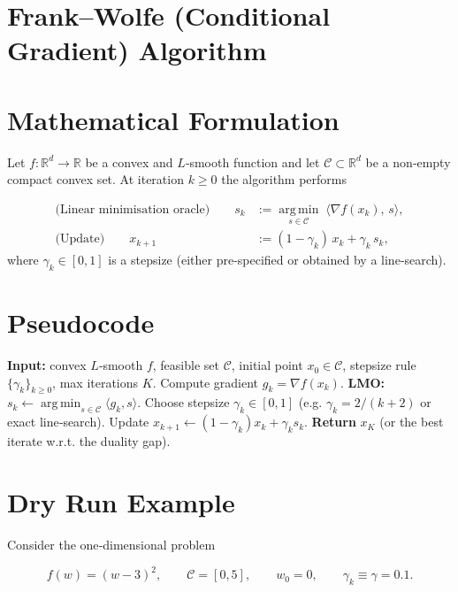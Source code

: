 \documentclass{article}
\newcommand{\argmin}{\operatorname*{arg\,min}}
\begin{document}
\section*{Frank–Wolfe (Conditional Gradient) Algorithm}

\section*{Mathematical Formulation}
Let $f:\mathbb{R}^d\rightarrow\mathbb{R}$ be a convex and $L$‑smooth function and let $\mathcal{C}\subset\mathbb{R}^d$ be a non‑empty compact convex set.  
At iteration $k\ge 0$ the algorithm performs  

\[
\begin{aligned}
\text{(Linear minimisation oracle)}\qquad 
s_k &:= \argmin_{s\in\mathcal{C}}\;\langle \nabla f(x_k),\,s\rangle, \tag{1}\\[4pt]
\text{(Update)}\qquad 
x_{k+1} &:= (1-\gamma_k)\,x_k + \gamma_k\, s_k, \tag{2}
\end{aligned}
\]
where $\gamma_k\in[0,1]$ is a stepsize (either pre‑specified or obtained by a line‑search).

\section*{Pseudocode}
\begin{algorithm}[H]
\caption{Frank–Wolfe}
\begin{algorithmic}[1]
\STATE \textbf{Input:} convex $L$‑smooth $f$, feasible set $\mathcal{C}$, initial point $x_0\in\mathcal{C}$, stepsize rule $\{\gamma_k\}_{k\ge0}$, max iterations $K$.
    \STATE Compute gradient $g_k=\nabla f(x_k)$.
    \STATE \textbf{LMO:} $s_k \leftarrow \argmin_{s\in\mathcal{C}}\langle g_k,s\rangle$.
    \STATE Choose stepsize $\gamma_k\in[0,1]$ (e.g. $\gamma_k=2/(k+2)$ or exact line‑search).
    \STATE Update $x_{k+1}\leftarrow (1-\gamma_k)x_k+\gamma_k s_k$.
\ENDFOR
\STATE \textbf{Return} $x_K$ (or the best iterate w.r.t. the duality gap).
\end{algorithmic}
\end{algorithm}

\section*{Dry Run Example}
Consider the one‑dimensional problem  

\[
f(w)=(w-3)^2,\qquad \mathcal{C}=[0,5],\qquad w_0=0,\qquad \gamma_k\equiv \gamma=0.1 .
\]
\end{document}
